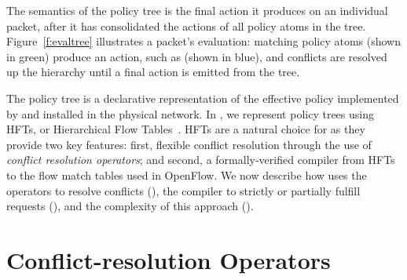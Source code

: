 The semantics of the policy tree is the final action it produces on an
individual packet, after it has consolidated the actions of all
policy atoms in the tree. Figure~\ref{f:evaltree} illustrates a packet's
evaluation: matching policy atoms (shown in green) produce an action,
such as  (shown in blue), and conflicts are resolved up the
hierarchy until a final action is emitted from the tree.

The policy tree is a declarative representation of the effective policy implemented by
\sys and installed in the physical network. In \sys, we represent
policy trees using HFTs, or Hierarchical Flow Tables~\cite{Ferguson:2012b}.
HFTs are a natural choice for \sys as they provide two key features:
first, flexible conflict resolution through the use of \emph{conflict resolution operators};
and second, a formally-verified compiler from HFTs to the flow match tables
used in OpenFlow.
We now describe how \sys uses the operators to resolve conflicts (),
the compiler to strictly or partially fulfill requests (),
and the complexity of this approach ().

\section{Conflict-resolution Operators}
\label{sec:conflict-resolution-operators}

